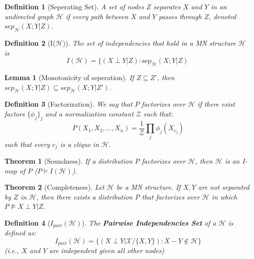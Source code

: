 \documentclass[11pt]{article}
\numberwithin{equation}{section}
\theoremstyle{boldStyle}
\theoremstyle{boldBlueStyle}
\newtheorem{lemma}{Lemma}[section]
\theoremstyle{boldPurpleStyle}
\newtheorem{theorem}{Theorem}[section]
\theoremstyle{boldRedStyle}
\newtheorem{definition}{Definition}[section]
\begin{document}
\begin{definition}[Seperating Set]
    A set of nodes $Z$ separates $X$ and $Y$ in an undirected graph $\mathcal{H}$ if every path between $X$ and $Y$ passes through $Z$, 
    denoted $sep_{\mathcal{H}}(X;Y | Z)$.
\end{definition}

\begin{definition}[I($\mathcal{H}$)]
    The set of independencies that hold in a MN structure $\mathcal{H}$ is 
    \begin{equation*}
        I(\mathcal{H}) = \{ (X \perp Y | Z) : \text{sep}_{\mathcal{H}}(X;Y | Z) \
    \end{equation*}
\end{definition}

\begin{lemma}[Monotonicity of seperation]
    If $Z \subseteq Z'$, then $sep_{\mathcal{H}}(X;Y | Z) \subseteq sep_{\mathcal{H}}(X;Y | Z')$.
\end{lemma}

\begin{definition}[Factorization]
    We say that $P$ factorizes over $\mathcal{H}$ if there exist factors $\{ \phi_j \}_{j}$ and a normalization constant $\mathcal{Z}$ such that:
    \begin{equation*}
        P(X_1, X_2, \ldots, X_n) = \frac{1}{\mathcal{Z}} \prod_{j} \phi_j(X_{c_j})
    \end{equation*}
    such that every $c_j$ is a clique in $\mathcal{H}$.
\end{definition}

\begin{theorem}[Soundness]
    If a distribution $P$ factorizes over $\mathcal{H}$, then $\mathcal{H}$ is an I-map of $P$ ($P \models I(\mathcal{H})$).
\end{theorem}

\begin{theorem}[Completeness]
    Let $\mathcal{H}$ be a MN structure. If $X, Y$ are not separated by $Z$ in $\mathcal{H}$, 
    then there exists a distribution $P$ that factorizes over $\mathcal{H}$ in which $P \not\models X \perp Y | Z$.
\end{theorem}


\begin{definition}[$I_{pair}(\mathcal{H})$]
    The \textbf{Pairwise Independencies Set} of a $\mathcal{H}$ is defined as:
    \begin{equation*}
        I_{pair}(\mathcal{H}) = \{ (X \perp Y | \mathcal{X} / \{ X,Y \}) : X - Y \notin \mathcal{H} \}
    \end{equation*}
    (i.e., $X$ and $Y$ are independent given all other nodes)
\end{definition}
\end{document}
